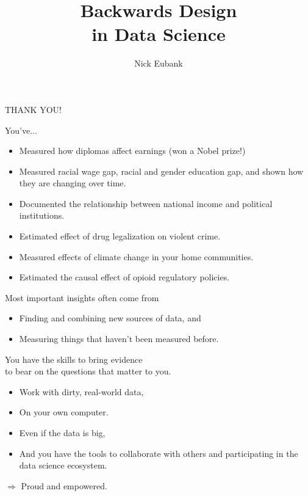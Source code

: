 \documentclass[11pt]{beamer}
\title{Backwards Design \\ in Data Science}
\author{\small Nick Eubank}
\date{\vspace*{.3in} \date}
\begin{document}
\begin{frame}[c]
\centering
\pause THANK YOU!
\end{frame}

\begin{frame}[c]{}
You've...
  \begin{itemize}
    \item Measured how diplomas affect earnings (won a Nobel prize!)
    \pause \item Measured racial wage gap, racial and gender education gap, and shown how they are changing over time.
    \pause \item Documented the relationship between national income and political institutions.
    \pause \item Estimated effect of drug legalization on violent crime.
    \pause \item Measured effects of climate change in your home communities.
    \pause \item Estimated the causal effect of opioid regulatory policies.
  \end{itemize}
\end{frame}

\begin{frame}[c]{}
Most important insights often come from
\begin{itemize}
  \pause \item Finding and combining new sources of data, and
  \pause \item Measuring things that haven't been measured before.
\end{itemize}
\end{frame}

\begin{frame}[c]{}
\begin{center}
  You have the skills to bring evidence \\
  to bear \alert{on the questions that matter to you.}

\end{center}

\begin{itemize}
  \pause \item Work with dirty, real-world data,
  \pause \item On your own computer.
  \pause \item Even if the data is big,
  \pause \item And you have the tools to collaborate with others and participating in the data science ecosystem.
\end{itemize}
\vspace*{1cm}
\pause $\Rightarrow$ \alert{Proud} and \alert{empowered}.
\end{frame}
\end{document}

